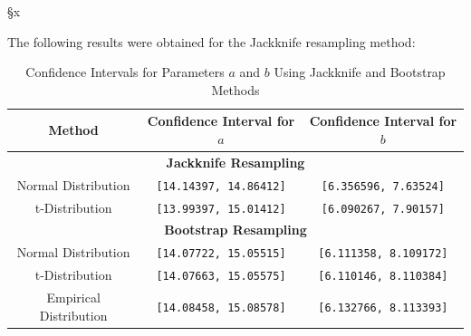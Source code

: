 §x\documentclass[]{article}
\begin{document}
\noindent The following results were obtained for the Jackknife resampling method:

%
%
%

\begin{table}[h]
	\centering
	\begin{tabular}{|c|c|c|}
		\hline
		\textbf{Method} & \textbf{Confidence Interval for $a$} & \textbf{Confidence Interval for $b$} \\
		\hline
		\multicolumn{3}{|c|}{\textbf{Jackknife Resampling}} \\
		\hline
		Normal Distribution & \texttt{[14.14397, 14.86412]} & \texttt{[6.356596, 7.63524]} \\
		t-Distribution & \texttt{[13.99397, 15.01412]} & \texttt{[6.090267, 7.90157]} \\
		\hline
		\multicolumn{3}{|c|}{\textbf{Bootstrap Resampling}} \\
		\hline
		Normal Distribution & \texttt{[14.07722, 15.05515]} & \texttt{[6.111358, 8.109172]} \\
		t-Distribution & \texttt{[14.07663, 15.05575]} & \texttt{[6.110146, 8.110384]} \\
		Empirical Distribution & \texttt{[14.08458, 15.08578]} & \texttt{[6.132766, 8.113393]} \\
		\hline
	\end{tabular}
	\caption{Confidence Intervals for Parameters $a$ and $b$ Using Jackknife and Bootstrap Methods}
	\label{tab:ci_results}
\end{table}
\end{document}
